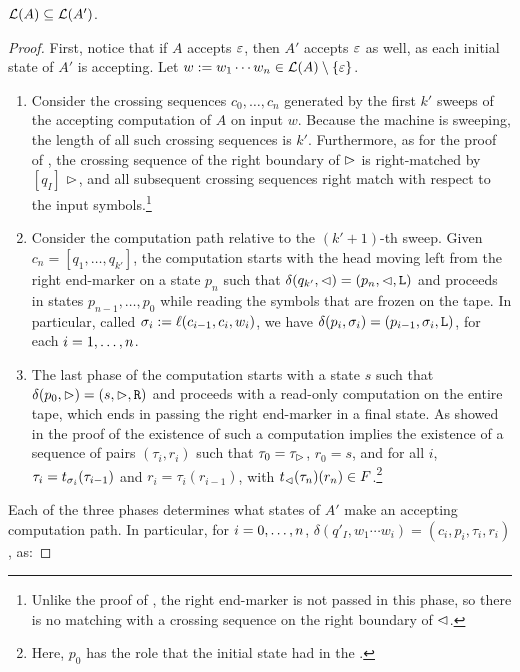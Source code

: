 \begin{lemm}\label{lem:swkLAtoNFA-1}
	$\mathcal L(A)\subseteq\mathcal L(A')$.
\end{lemm}
\begin{proof}
	First, notice that if $A$ accepts $\varepsilon$, then $A'$ accepts $\varepsilon$ as well, as each initial state of $A'$ is accepting.
	Let $w:=w_1\cdots w_n\in\mathcal L(A)\setminus\{\varepsilon\}$.
	\begin{enumerate}
		\item Consider the crossing sequences $c_0,\dots,c_n$ generated by the first $k'$ sweeps of the accepting computation of $A$ on input $w$.
		      Because the machine is sweeping, the length of all such crossing sequences is $k'$.
		      Furthermore, as for the proof of , the crossing sequence of the right boundary of $\rhd$ is right-matched by $[q_I]$ \wrt $\rhd$, and all subsequent crossing sequences right match with respect to the input symbols.\footnote{%
			      Unlike the proof of , the right end-marker is not passed in this phase, so there is no matching with a crossing sequence on the right boundary of $\lhd$.}
		\item Consider the computation path relative to the $(k'+1)$-th sweep.
		      Given $c_n=[q_1,\dots,q_{k'}]$, the computation starts with the head moving left from the right end-marker on a state $p_n$ such that $\delta(q_{k'},\lhd)=(p_n,\lhd,\mathtt L)$ and proceeds in states $p_{n-1},\dots,p_0$ while reading the symbols that are frozen on the tape.
		      In particular, called $\sigma_i:=\ell(c_{i-1},c_i,w_i)$, we have $\delta(p_i,\sigma_i)=(p_{i-1},\sigma_i,\mathtt L)$, for each $i=1,\dots,n$.
		\item The last phase of the computation starts with a state $s$ such that $\delta(p_0,\rhd)=(s,\rhd,\mathtt R)$ and proceeds with a read-only computation on the entire tape, which ends in passing the right end-marker in a final state.
		      As showed in the proof of  the existence of such a computation implies the existence of a sequence of pairs $(\tau_i,r_i)$ such that $\tau_0=\tau_\rhd$, $r_0=s$, and for all $i$, $\tau_i=t_{\sigma_i}(\tau_{i-1})$ and $r_i=\tau_i(r_{i-1})$, with $t_\lhd(\tau_n)(r_n)\in F$.\footnote{%
			      Here, $p_0$ has the role that the initial state had in the \TDFA.}
	\end{enumerate}
	Each of the three phases determines what states of $A'$ make an accepting computation path. In particular, for $i=0,\dots,n$, $\delta(q'_I,w_1\cdots w_i)=(c_i,p_i,\tau_i,r_i)$, as:

\end{proof}
